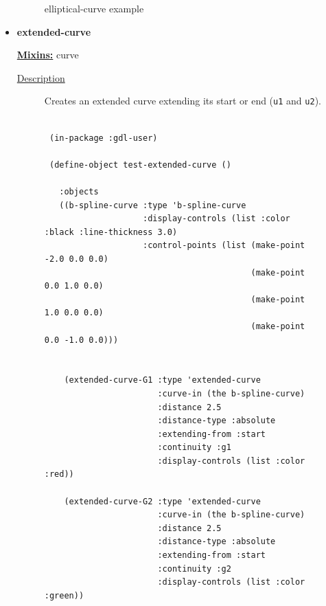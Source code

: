 \documentclass [11pt]{book}
\begin{document}
\begin{itemize}
\begin{figure}
\caption{elliptical-curve example}

\label{fig:elliptical-curve}

\end{figure}






\item {}
\label{prim:extended-curve}
\textbf{extended-curve}


\textbf{
\underline{Mixins:}} curve





\begin{description}

\item [
\underline{Description}]


Creates an extended curve extending its start or end  (\texttt{u1} and \texttt{u2}).



\end{description}




\begin{figure}
\begin{lrbox}{\boxedverb}
\begin{minipage}{\linewidth}
{\small

\begin{verbatim}
  
 (in-package :gdl-user)

 (define-object test-extended-curve ()

   :objects
   ((b-spline-curve :type 'b-spline-curve
                    :display-controls (list :color :black :line-thickness 3.0)
                    :control-points (list (make-point -2.0 0.0 0.0)
                                          (make-point  0.0 1.0 0.0) 
                                          (make-point  1.0 0.0 0.0) 
                                          (make-point  0.0 -1.0 0.0))) 
                                           
    
    (extended-curve-G1 :type 'extended-curve
                       :curve-in (the b-spline-curve)
                       :distance 2.5
                       :distance-type :absolute
                       :extending-from :start
                       :continuity :g1
                       :display-controls (list :color :red))
    
    (extended-curve-G2 :type 'extended-curve
                       :curve-in (the b-spline-curve)
                       :distance 2.5
                       :distance-type :absolute
                       :extending-from :start
                       :continuity :g2
                       :display-controls (list :color :green))
    

\end{verbatim}}
\end{minipage}
\end{lrbox}
\end{figure}
\end{itemize}
\end{document}
